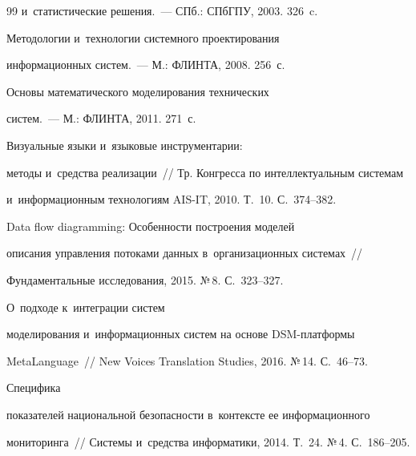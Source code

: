{{\begin{thebibliography}{99}
и~статистические решения.~--- СПб.: СПбГПУ, 2003. 326~c.




 Методологии и~технологии системного проектирования 


информационных сис\-тем.~--- М.: ФЛИНТА, 2008. 256~с.




 Основы математического моделирования технических  


сис\-тем.~--- М.: ФЛИНТА, 2011. 271~с.










 Визуальные языки и~языковые инструментарии: 


методы и~средства реализации~/\!\!/ Тр. Конгресса по интеллектуальным системам 


и~информационным технологиям AIS-IT, 2010. Т.~10. С.~374--382.







 Data flow diagramming: Особенности построения моделей 


описания управления потоками данных в~организационных сис\-те\-мах~/\!\!/ 


Фундаментальные исследования, 2015. №\,8. С.~323--327.







 О~подходе к~интеграции систем 


моделирования и~информационных систем на основе DSM-плат\-фор\-мы 


MetaLanguage~/\!\!/ New Voices Translation Studies, 2016. №\,14. С.~46--73.




 Специфика 


показателей национальной безопасности в~контексте ее информационного 


мониторинга~/\!\!/ Системы и~средства информатики, 2014. Т.~24. №\,4. С.~186--205.






\end{thebibliography}}}
